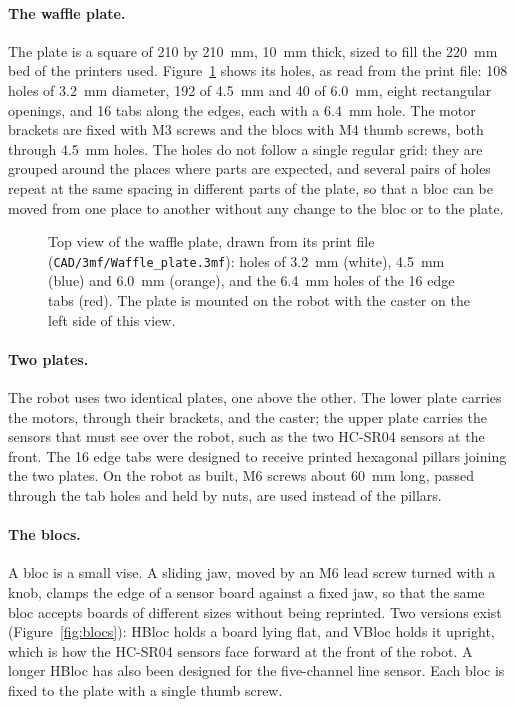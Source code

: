 \paragraph{The waffle plate.} The plate is a square of 210 by 210~mm, 10~mm thick, sized
to fill the 220~mm bed of the printers used. Figure~\ref{fig:waffle} shows its holes, as
read from the print file: 108 holes of 3.2~mm diameter, 192 of 4.5~mm and 40 of 6.0~mm,
eight rectangular openings, and 16 tabs along the edges, each with a 6.4~mm hole. The motor
brackets are fixed with M3 screws and the blocs with M4 thumb screws, both through 4.5~mm
holes. The holes do not follow a single regular grid: they are grouped around the places
where parts are expected, and several pairs of holes repeat at the same spacing in
different parts of the plate, so that a bloc can be moved from one place to another
without any change to the bloc or to the plate.

\begin{figure}[htbp]
  \centering
  
  \caption[Top view of the waffle plate]{Top view of the waffle plate, drawn from its print
           file (\texttt{CAD/3mf/Waffle\_plate.3mf}): holes of 3.2~mm (white), 4.5~mm
           (blue) and 6.0~mm (orange), and the 6.4~mm holes of the 16 edge tabs (red). The
           plate is mounted on the robot with the caster on the left side of this view.}
  \label{fig:waffle}
\end{figure}

\paragraph{Two plates.} The robot uses two identical plates, one above the other. The lower
plate carries the motors, through their brackets, and the caster; the upper plate carries
the sensors that must see over the robot, such as the two HC-SR04 sensors at the front. The 16 edge
tabs were designed to receive printed hexagonal pillars joining the two plates. On the
robot as built, M6 screws about 60~mm long, passed through the tab holes and held by
nuts, are used instead of the pillars. 

\paragraph{The blocs.} A bloc is a small vise. A sliding jaw, moved by an M6 lead screw
turned with a knob, clamps the edge of a sensor board against a fixed jaw, so that the same
bloc accepts boards of different sizes without being reprinted. Two versions exist
(Figure~\ref{fig:blocs}): HBloc holds a board lying flat, and VBloc holds it upright, which
is how the HC-SR04 sensors face forward at the front of the robot. A longer HBloc has also been
designed for the five-channel line sensor. Each bloc is fixed to the plate with a single
thumb screw.

